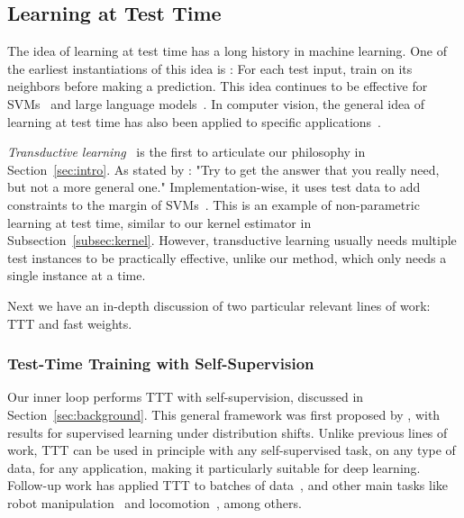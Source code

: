 \documentclass{article} %
\begin{document}
\subsection{Learning at Test Time}
\label{subsec:rel-ttt}

The idea of learning at test time has a long history in machine learning.
One of the earliest instantiations of this idea is \cite{bottou1992local}:
For each test input, train on its neighbors before making a prediction.
This idea continues to be effective for SVMs~\citep{zhang2006svm} and large language models~\citep{hardt2023test}.
In computer vision, the general idea of learning at test time has also been applied to specific applications~\citep{jain2011online, shocher2018zero, mullapudi2018online, luo2020consistent, nitzan2022mystyle}.

\emph{Transductive learning}~\citep{Gammerman98learningby} is the first to articulate our philosophy in Section~\ref{sec:intro}.
As stated by \cite{vapnik2013nature}:
"Try to get the answer that you really need, but not a more general one."
Implementation-wise, it uses test data to add constraints to the margin of SVMs~\citep{joachims2002learning, collobert2006large}.
This is an example of non-parametric learning at test time, similar to our kernel estimator in Subsection~\ref{subsec:kernel}. 
However, transductive learning usually needs multiple test instances to be practically effective, unlike our method, which only needs a single instance at a time.

Next we have an in-depth discussion of two particular relevant lines of work: TTT and fast weights.

\subsubsection{Test-Time Training with Self-Supervision}

Our inner loop performs TTT with self-supervision, discussed in Section~\ref{sec:background}. 
This general framework was first proposed by \cite{sun2020test}, with results for supervised learning under distribution shifts.
Unlike previous lines of work, TTT can be used in principle with any self-supervised task, on any type of data, for any application, making it particularly suitable for deep learning.
Follow-up work has applied TTT to 
batches of data~\citep{wang2020tent, liu2021ttt++}, and other main tasks like
robot manipulation~\citep{hansen2020self} and locomotion~\citep{sun2021online},
among others.
\end{document}
